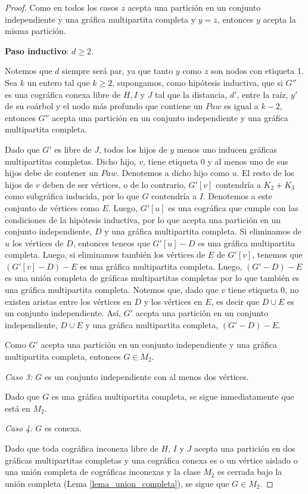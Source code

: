\begin{proof}
    Como en todos los casos $z$ acepta una partición en un conjunto independiente y una gráfica multipartita completa y $y = z$, entonces $y$ acepta la misma partición.

    \textbf{Paso inductivo}: $d \geq 2$.

    Notemos que $d$ siempre será par, ya que tanto $y$ como $z$ son nodos con etiqueta 1. Sea $k$ un entero tal que $k \geq 2$, supongamos, como hipótesis inductiva, que si $G''$ es una cográfica conexa libre de $H, I$ y $J$ tal que la distancia, $d'$, entre la raíz, $y'$ de su coárbol y el nodo más profundo que contiene un $Paw$ es igual a $k-2$, entonces $G''$ acepta una partición en un conjunto independiente y una gráfica multipartita completa.

    Dado que $G'$ es libre de $J$, todos los hijos de $y$ menos uno inducen gráficas multipartitas completas. Dicho hijo, $v$, tiene etiqueta 0 y al menos uno de sus hijos debe de contener un $Paw$. Denotemos a dicho hijo como $u$. El resto de los hijos de $v$ deben de ser vértices, o de lo contrario, $G'[v]$ contendría a $K_2 + K_3$ como subgráfica inducida, por lo que $G$ contendría a $I$. Denotemos a este conjunto de vértices como $E$. Luego, $G'[u]$  es una cográfica que cumple con las condiciones de la hipótesis inductiva, por lo que acepta una partición en un conjunto independiente, $D$ y una gráfica multipartita completa. Si eliminamos de $u$ los vértices de $D$, entonces teneos que $G'[u] - D$ es una gráfica multipartita completa. Luego, si eliminamos también los vértices de $E$ de $G'[v]$, tenemos que $(G'[v]-D)-E$ es una gráfica multipartita completa. Luego, $(G'-D)-E$ es una unión completa de gráficas multipartitas completas por lo que también es una gráfica multipartita completa. Notemos que, dado que $v$ tiene etiqueta 0, no existen aristas entre los vértices en $D$ y los vértices en $E$, es decir que $D \cup E$ es un conjunto independiente. Así, $G'$ acepta una partición en un conjunto independiente, $D \cup E$ y una gráfica multipartita completa, $(G' - D) - E$.

    Como $G'$ acepta una partición en un conjunto independiente y una gráfica multipartita completa, entonces $G \in M_2$.


    \emph{Caso 3:} $G$ es un conjunto independiente con al menos dos vértices.

    Dado que $G$ es una gráfica multipartita completa, se sigue inmediatamente que está en $M_2$.

    \emph{Caso 4:} $G$ es conexa.

    Dado que toda cográfica inconexa libre de $H$, $I$ y $J$ acepta una partición en dos gráficas multipartitas completas y una cográfica conexa es o un vértice aislado o una unión completa de cográficas inconexas y la clase $M_2$ es cerrada bajo la unión completa (Lema \ref{lema_union_completa}), se sigue que $G \in M_2$.

\end{proof}
